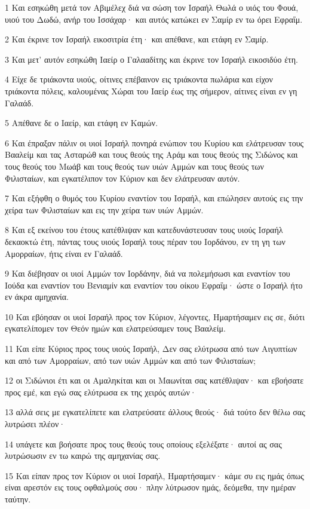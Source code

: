 \par 1 Και εσηκώθη μετά τον Αβιμέλεχ διά να σώση τον Ισραήλ Θωλά ο υιός του Φουά, υιού του Δωδώ, ανήρ του Ισσάχαρ· και αυτός κατώκει εν Σαμίρ εν τω όρει Εφραΐμ.
\par 2 Και έκρινε τον Ισραήλ εικοσιτρία έτη· και απέθανε, και ετάφη εν Σαμίρ.
\par 3 Και μετ' αυτόν εσηκώθη Ιαείρ ο Γαλααδίτης και έκρινε τον Ισραήλ εικοσιδύο έτη.
\par 4 Είχε δε τριάκοντα υιούς, οίτινες επέβαινον εις τριάκοντα πωλάρια και είχον τριάκοντα πόλεις, καλουμένας Χώραι του Ιαείρ έως της σήμερον, αίτινες είναι εν γη Γαλαάδ.
\par 5 Απέθανε δε ο Ιαείρ, και ετάφη εν Καμών.
\par 6 Και έπραξαν πάλιν οι υιοί Ισραήλ πονηρά ενώπιον του Κυρίου και ελάτρευσαν τους Βααλείμ και τας Ασταρώθ και τους θεούς της Αράμ και τους θεούς της Σιδώνος και τους θεούς του Μωάβ και τους θεούς των υιών Αμμών και τους θεούς των Φιλισταίων, και εγκατέλιπον τον Κύριον και δεν ελάτρευσαν αυτόν.
\par 7 Και εξήφθη ο θυμός του Κυρίου εναντίον του Ισραήλ, και επώλησεν αυτούς εις την χείρα των Φιλισταίων και εις την χείρα των υιών Αμμών.
\par 8 Και εξ εκείνου του έτους κατέθλιψαν και κατεδυνάστευσαν τους υιούς Ισραήλ δεκαοκτώ έτη, πάντας τους υιούς Ισραήλ τους πέραν του Ιορδάνου, εν τη γη των Αμορραίων, ήτις είναι εν Γαλαάδ.
\par 9 Και διέβησαν οι υιοί Αμμών τον Ιορδάνην, διά να πολεμήσωσι και εναντίον του Ιούδα και εναντίον του Βενιαμίν και εναντίον του οίκου Εφραΐμ· ώστε ο Ισραήλ ήτο εν άκρα αμηχανία.
\par 10 Και εβόησαν οι υιοί Ισραήλ προς τον Κύριον, λέγοντες, Ημαρτήσαμεν εις σε, διότι εγκατελίπομεν τον Θεόν ημών και ελατρεύσαμεν τους Βααλείμ.
\par 11 Και είπε Κύριος προς τους υιούς Ισραήλ, Δεν σας ελύτρωσα από των Αιγυπτίων και από των Αμορραίων, από των υιών Αμμών και από των Φιλισταίων;
\par 12 οι Σιδώνιοι έτι και οι Αμαληκίται και οι Μαωνίται σας κατέθλιψαν· και εβοήσατε προς εμέ, και εγώ σας ελύτρωσα εκ της χειρός αυτών·
\par 13 αλλά σεις με εγκατελίπετε και ελατρεύσατε άλλους θεούς· διά τούτο δεν θέλω σας λυτρώσει πλέον·
\par 14 υπάγετε και βοήσατε προς τους θεούς τους οποίους εξελέξατε· αυτοί ας σας λυτρώσωσιν εν τω καιρώ της αμηχανίας σας.
\par 15 Και είπαν προς τον Κύριον οι υιοί Ισραήλ, Ημαρτήσαμεν· κάμε συ εις ημάς όπως είναι αρεστόν εις τους οφθαλμούς σου· πλην λύτρωσον ημάς, δεόμεθα, την ημέραν ταύτην.
